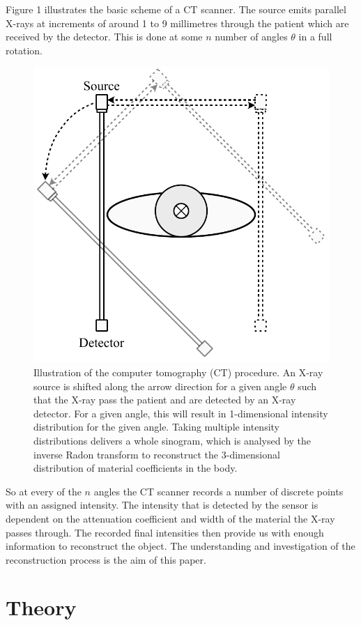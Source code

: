 \documentclass[12pt]{article}
\begin{document}
Figure 1 illustrates the basic scheme of a CT scanner. The source emits parallel X-rays at increments of around 1 to 9 millimetres through the patient which are received by the detector. This is done at some $n$ number of angles $\theta$ in a full rotation.
\begin{figure}[hbt]
	\includegraphics[width=.4\textwidth]{images/ct_scanner.pdf}	
	\caption{Illustration of the computer tomography (CT) procedure. An X-ray source is shifted along the arrow direction for a given angle $\theta$ such that the X-ray pass the patient and are detected by an X-ray detector. For a given angle, this will result in 1-dimensional intensity distribution for the given angle. Taking multiple intensity distributions delivers a whole sinogram, which is analysed by the inverse Radon transform to reconstruct the 3-dimensional distribution of material coefficients in the body.}
\end{figure}
So at every of the $n$ angles the CT scanner records a number of discrete points with an assigned intensity. The intensity that is detected by the sensor is dependent on the attenuation coefficient and width of the material the X-ray passes through. The recorded final intensities then provide us with enough information to reconstruct the object. The understanding and investigation of the reconstruction process is the aim of this paper.
\section{Theory}
\end{document}
